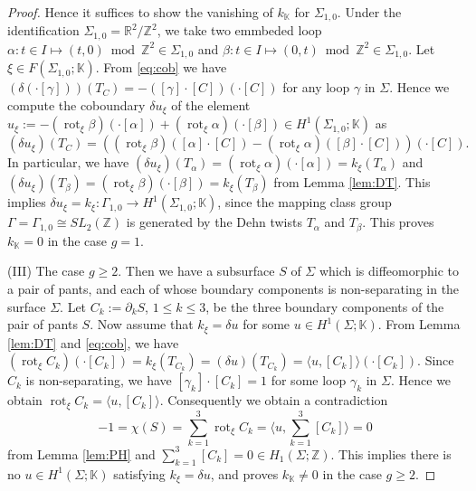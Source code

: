 \documentclass[10pt,a4paper]{amsart}
\newcommand\bK{{\mathbb{K}}}
\newcommand\bR{{\mathbb{R}}}
\newcommand\bZ{{\mathbb{Z}}}
\newcommand\pa{\partial}
\newcommand\rot{\operatorname{rot}}
\begin{document}
\begin{proof}
Hence it suffices to show the vanishing of $k_{\bK}$ for $\Sigma_{1,0}$. 
Under the identification $\Sigma_{1,0} = \bR^2/\bZ^2$, we take two emmbeded loop $\alpha: t \in I \mapsto (t,0)\bmod{\bZ^2} \in \Sigma_{1,0}$ and $\beta: t \in I \mapsto (0, t)\bmod{\bZ^2} \in \Sigma_{1,0}$. %
Let $\xi \in F(\Sigma_{1,0}; \bK)$. 
From \eqref{eq:cob} we have $(\delta(\cdot[\gamma]))(T_C) = -([\gamma]\cdot[C])(\cdot [C])$ for any loop $\gamma$ in $\Sigma$. 
Hence we compute the coboundary $\delta u_\xi$ of the element $u_\xi := -  (\rot_\xi\beta)(\cdot [\alpha]) + (\rot_\xi\alpha)(\cdot [\beta]) \in H^1(\Sigma_{1,0}; \bK)$ as
$$
(\delta u_\xi)(T_C) = \left((\rot_\xi\beta)([\alpha]\cdot [C]) - (\rot_\xi\alpha)([\beta]\cdot [C]) \right)(\cdot [C]).
$$
In particular, we have $(\delta u_\xi)(T_\alpha) = (\rot_\xi\alpha)(\cdot [\alpha]) = k_\xi(T_\alpha)$ and $(\delta u_\xi)(T_\beta) = (\rot_\xi\beta)(\cdot [\beta]) = k_\xi(T_\beta)$ from Lemma \ref{lem:DT}. 
This implies $\delta u_\xi = k_\xi: \Gamma_{1,0} \to H^1(\Sigma_{1,0}; \bK)$,  
since the mapping class group $\Gamma = \Gamma_{1,0} \cong SL_2(\bZ)$ is generated by the Dehn twists $T_\alpha$ and $T_\beta$. This proves $k_\bK = 0$ in the case $g=1$. \par
(III) The case $g \geq 2$. Then we have a subsurface $S$ of $\Sigma$ which is diffeomorphic to a pair of pants, and each of whose boundary components is non-separating in the surface $\Sigma$. Let $C_k := \pa_kS$, $1 \leq k \leq 3$, be the three boundary components of the pair of pants $S$. 
Now assume that $k_\xi = \delta u$ for some $u \in H^1(\Sigma; \bK)$. 
From Lemma \ref{lem:DT} and \eqref{eq:cob}, we have $(\rot_\xi C_k)(\cdot [C_k])
= k_\xi(T_{C_k}) = (\delta u)(T_{C_k}) = \langle u, [C_k]\rangle (\cdot [C_k])$. 
Since $C_k$ is non-separating, we have $[\gamma_k]\cdot [C_k] = 1$ for some loop $\gamma_k$ in $\Sigma$. Hence we obtain $\rot_\xi C_k = \langle u, [C_k]\rangle$.
Consequently we obtain a contradiction 
$$
-1 = \chi(S) = {\sum}^3_{k=1}\rot_\xi C_k = \langle u, {\sum}^3_{k=1}[C_k]\rangle = 0
$$
from Lemma \ref{lem:PH} and $\sum^3_{k=1}[C_k] = 0 \in H_1(\Sigma; \bZ)$. 
This implies there is no $u \in H^1(\Sigma; \bK)$ satisfying $k_\xi = \delta u$, and 
proves $k_\bK \not= 0$ in the case $g\geq 2$. 
\end{proof}
\end{document}
